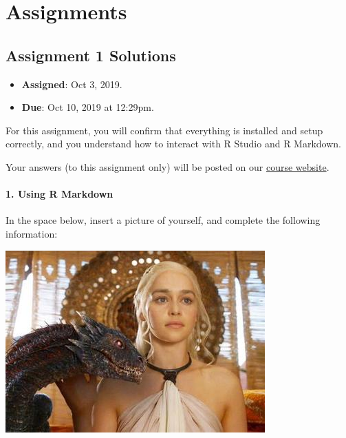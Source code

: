 \documentclass[]{book}
\providecommand{\tightlist}{%
  \setlength{\itemsep}{0pt}\setlength{\parskip}{0pt}}
\begin{document}
\hypertarget{assignments-1}{%
\chapter{Assignments}\label{assignments-1}}

\hypertarget{assignment-1-solutions}{%
\section{Assignment 1 Solutions}\label{assignment-1-solutions}}

\begin{itemize}
\tightlist
\item
  \textbf{Assigned}: Oct 3, 2019.
\item
  \textbf{Due}: Oct 10, 2019 at 12:29pm.
\end{itemize}

For this assignment, you will confirm that everything is installed and setup correctly, and you understand how to interact with R Studio and R Markdown.

Your answers (to this assignment only) will be posted on our \href{https://github.com/rochelleterman/plsc-31101}{course website}.

\hypertarget{using-r-markdown}{%
\subsubsection*{1. Using R Markdown}\label{using-r-markdown}}

In the space below, insert a picture of yourself, and complete the following information:

\includegraphics{img/dany.jpg}
\end{document}
